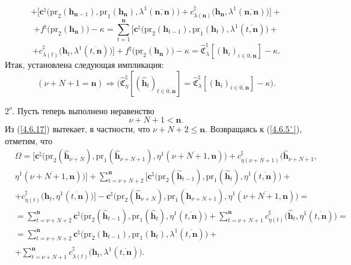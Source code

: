 \documentclass[11pt,twoside]{report}
\newcommand{\bfn}{\begin{equation}}
\newcommand{\efn}{\end{equation}}
\newcommand{\ov}{\overline}
\newcommand{\Om}{\Omega}
\newcommand{\la}{\lambda}
\newcommand{\zc}{{\mathbf c}}
\newcommand{\nn}{{\mathbf n}}
\begin{document}
{{$$$$
$$
+\bigl[\zc^\natural\bigl(\mathrm{pr}_2(\mathbf{h}_{\nn-1}),\mathrm{pr}_1(\mathbf{h}_\nn),\la^1(\ov{\nn,\nn})
\bigl)+c_{\la(\nn)}^\natural\bigl(\mathbf{h}_\nn,\la^1(\ov{\nn,\nn})\bigl)\bigl] +
$$
$$
+f^\natural\bigl(\mathrm{pr}_2(\mathbf{h}_\nn)\bigl) -\kappa =
\sum\limits_{t=1}^\nn\bigl[\zc^\natural\bigl(\mathrm{pr}_2(\mathbf{h}_{t-1}),\mathrm{pr}_1
(\mathbf{h}_t),\la^1(\ov{t,\nn})\bigl)+
$$
$$+ c_{\la(t)}^\natural\bigl(\mathbf{h}_t,\la^1(\ov{t,\nn})\bigl)\bigl] +
f^\natural\bigl(\mathrm{pr}_2(\mathbf{h}_\nn)\bigl) -\kappa =
\widehat{\mathfrak{C}}_\lambda^\natural[(\mathbf{h}_i)_{i\in\ov{0,\nn}}]-\kappa.
$$
Итак, установлена следующая импликация:
\bfn\label{4.6.16}
(\nu+N+1 =\nn)\Longrightarrow \bigl(\widehat{\mathfrak{C}}_\eta^\natural[(\hat{\mathbf{h}}_t)_{t\in\ov{0,\nn}}]=
\widehat{\mathfrak{C}}_\la^\natural[(\mathbf{h}_i)_{i\in\ov{0,\nn}}]-\kappa\bigl).
\efn

$2^o.$ Пусть теперь выполнено неравенство
\bfn\label{4.6.17}\nu+N+1 < \nn.
\efn
Из (\ref{4.6.17}) вытекает, в частности, что $\nu+N+2 \leqslant \nn.$ Возвращаясь к (\ref{4.6.5`}), отметим, что
\begin{eqnarray}
&\Om = \bigl[\zc^\natural\bigl(\mathrm{pr}_2(\hat{\mathbf{h}}_{\nu+N}),\mathrm{pr}_1(\hat{\mathbf{h}}_{\nu+N+1}),
 \eta^1(\ov{\nu+N+1,\nn})\bigl) + c_{\eta(\nu+N+1)}^\natural\bigl(\hat{\mathbf{h}}_{\nu+N+1},
&\nonumber\\
&\eta^1(\ov{\nu+N+1,\nn})\bigl)\bigl] + \sum\limits_{t=\nu+N+2}^\nn\bigl[
\zc^\natural\bigl(\mathrm{pr}_2(\hat{\mathbf{h}}_{t-1}),\mathrm{pr}_1(\hat{\mathbf{h}}_t),
 \eta^1(\ov{t,\nn})\bigl) +
&\nonumber\\
&+ c_{\eta(t)}^\natural\bigl(\hat{\mathbf{h}}_t,\eta^1(\ov{t,\nn})\bigl)\bigl]-
\zc^\natural\bigl(\mathrm{pr}_2(\hat{\mathbf{h}}_{\nu+N}),\mathrm{pr}_1(\hat{\mathbf{h}}_{\nu+N+1}),
\eta^1(\ov{\nu+N+1,\nn})\bigl) =
&\nonumber\\
&= \sum\limits_{t=\nu+N+2}^\nn    \zc^\natural\bigl(\mathrm{pr}_2(\hat{\mathbf{h}}_{t-1}),
\mathrm{pr}_1(\hat{\mathbf{h}}_t),
\eta^1(\ov{t,\nn})\bigl) + \sum\limits_{t=\nu+N+1}^\nn c_{\eta(t)}^\natural\bigl(\hat{\mathbf{h}}_t,
\eta^1(\ov{t,\nn})\bigl) =
&\nonumber\\
&=  \sum\limits_{t=\nu+N+2}^\nn    \zc^\natural\bigl(\mathrm{pr}_2(\mathbf{h}_{t-1}),\mathrm{pr}_1(\mathbf{h}_t),
 \la^1(\ov{t,\nn})\bigl) +
&\nonumber\\
&+\sum\limits_{t=\nu+N+1}^\nn c_{\la(t)}^\natural\bigl(\mathbf{h}_t, \la^1(\ov{t,\nn})\bigl).
&\label{4.6.18}
\end{eqnarray}

}}
\end{document}
